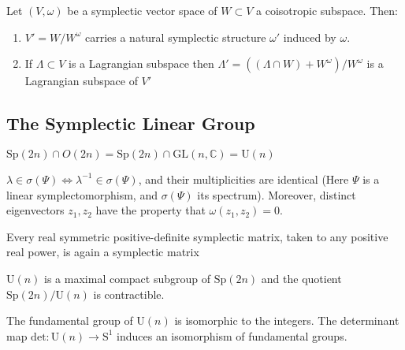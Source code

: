 \begin{lem}

Let $(V,\omega)$ be a symplectic vector space of $W \subset V$ a coisotropic subspace. Then: 
\begin{enumerate}
    \item $V'=W/W^{\omega}$ carries a natural symplectic structure $\omega '$ induced by $\omega$.
    \item If $\Lambda \subset V$ is a Lagrangian subspace then $\Lambda ' = ((\Lambda \cap W) + W^{\omega})/W^{\omega}$ is a Lagrangian subspace of $V'$
    
\end{enumerate}

\end{lem}

\subsection{The Symplectic Linear Group}

\begin{lem}

$\mathrm{Sp}(2n) \cap O(2n) = \mathrm{Sp}(2n) \cap \mathrm{GL}(n,\mathbb{C}) = \mathrm{U}(n)$

\end{lem}

\begin{lem}

$\lambda \in \sigma(\Psi) \iff \lambda^{-1} \in \sigma(\Psi)$, and their multiplicities are identical (Here $\Psi$ is a linear symplectomorphism, and $\sigma(\Psi)$ its spectrum). Moreover, distinct eigenvectors $z_1, z_2$ have the property that $\omega(z_1, z_2) = 0$. 

\end{lem}

\begin{lem}

Every real symmetric positive-definite symplectic matrix, taken to any positive real power, is again a symplectic matrix

\end{lem}

\begin{prop}

$\mathrm{U}(n)$ is a maximal compact subgroup of $\mathrm{Sp}(2n)$ and the quotient $\mathrm{Sp}(2n)/\mathrm{U}(n)$ is contractible. 

\end{prop}

\begin{prop}


The fundamental group of $\mathrm{U}(n)$ is isomorphic to the integers. The determinant map $\mathrm{det}: \mathrm{U}(n) \to \mathrm{S}^1$ induces an isomorphism of fundamental groups.

\end{prop}

